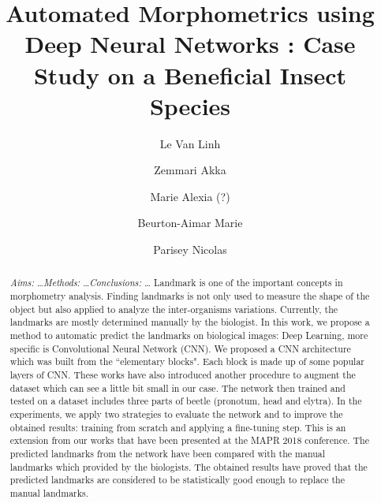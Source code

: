 \documentclass[review]{elsarticle}
\begin{document}
\begin{frontmatter}

  \title{Automated Morphometrics using Deep Neural Networks : Case Study on a Beneficial Insect Species}




\author[labri,itdlu]{Le Van Linh}
\author[labri]{Zemmari Akka}
\author[igepp]{Marie Alexia (?)}
\author[labri]{Beurton-Aimar Marie}
\author[igepp]{Parisey Nicolas}


\address[igepp]{UMR 1349 IGEPP, BP 35327, 35653 Le Rheu, France}

\address[labri]{University of Bordeaux, 351, cours de la Libération, 33405 Talence}
\address[itdlu]{Dalat University, Dalat, Lamdong, Vietnam}


\begin{abstract}
\textit{Aims:} \ldots \textit{Methods:} \ldots \textit{Conclusions:} \ldots
Landmark is one of the important concepts in morphometry analysis. Finding landmarks is not only used to measure the shape of the object but also applied to analyze the inter-organisms variations. Currently, the landmarks are mostly determined manually by the biologist.
In this work, we propose a method to automatic predict the landmarks on biological images: Deep Learning, more specific is Convolutional Neural Network (CNN). We proposed a CNN architecture which was built from the ``elementary blocks". Each block is made up of some popular layers of CNN. These works have also introduced another procedure to augment the dataset which can see a little bit small in our case. 
The network then trained and tested on a dataset includes three parts of beetle (pronotum, head and elytra). In the experiments, we apply two strategies to evaluate the network and to improve the obtained results: training from scratch and applying a fine-tuning step. This is an extension from our works that have been presented at the MAPR 2018 conference. The predicted landmarks from the network have been compared with the manual landmarks which provided by the biologists. The obtained results have proved that the predicted landmarks are considered to be statistically good enough to replace the manual landmarks.
\end{abstract}


\end{frontmatter}
\end{document}
